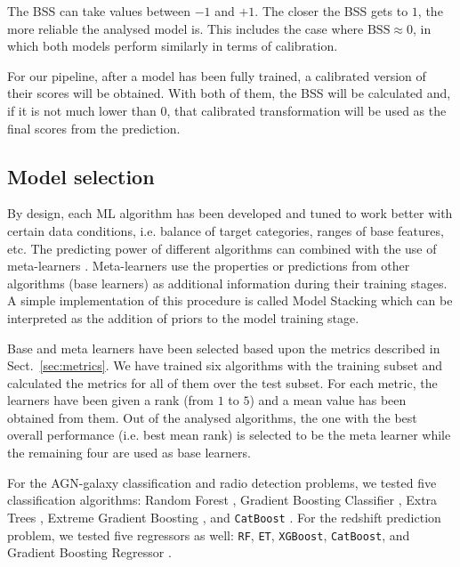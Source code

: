 \documentclass{aa}
\begin{document}
The BSS can take values between $-1$ and $+1$. The closer the BSS gets to $1$, the more reliable the analysed model is. This includes the case where ${\mathrm{BSS} {\approx} 0}$, in which both models perform similarly in terms of calibration.

For our pipeline, after a model has been fully trained, a calibrated version of their scores will be obtained. With both of them, the BSS will be calculated and, if it is not much lower than $0$, that calibrated transformation will be used as the final scores from the prediction.

\subsection{Model selection}\label{sec:model_selection}

By design, each ML algorithm has been developed and tuned to work better with certain data conditions, i.e. balance of target categories, ranges of base features, etc. 
The predicting power of different algorithms can combined with the use of  meta-learners \citep{Vanschoren2019}. Meta-learners use the properties or predictions from other algorithms (base learners) as additional information during their training stages. A simple implementation of this procedure is called Model Stacking \citep{WOLPERT1992241} which can be interpreted
as the addition of priors to the model training stage.

Base and meta learners have been selected based upon the metrics described in Sect.~\ref{sec:metrics}. We have trained six algorithms with the training subset and calculated the metrics for all of them over the test subset. For each metric, the learners have been given a rank (from $1$ to $5$) and a mean value has been obtained from them. Out of the analysed algorithms, the one with the best overall performance (i.e. best mean rank) is selected to be the meta learner while the remaining four are used as base learners.

For the AGN-galaxy classification and radio detection problems, we tested five classification algorithms: Random Forest \citep[\texttt{RF};][]{Breiman2001}, Gradient Boosting Classifier \citep[\texttt{GBC};][]{10.1214/aos/1013203451}, Extra Trees \citep[\texttt{ET};][]{Geurts2006}, Extreme Gradient Boosting \citep[\texttt{XGBoost}, \texttt{v1.5.1};][]{Chen:2016:XST:2939672.2939785}, and \texttt{CatBoost} \citep[\texttt{v1.0.5};][]{DBLP:journals/corr/DorogushGGKPV17, DBLP:journals/corr/abs-1810-11363}.
For the redshift prediction problem, we tested five regressors as well: \texttt{RF}, \texttt{ET}, \texttt{XGBoost}, \texttt{CatBoost}, and Gradient Boosting Regressor \citep[\texttt{GBR};][]{10.1214/aos/1013203451}.
\end{document}
